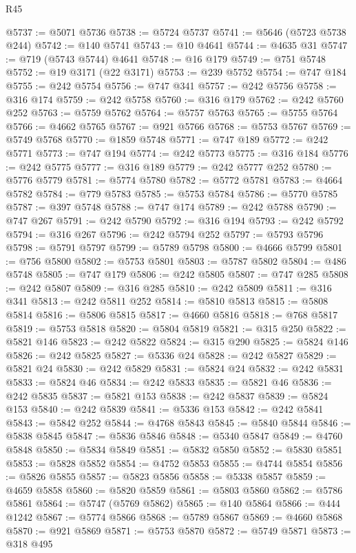 \begin{lexlean}{R45}
\begin{coremodule}
{@5737 := @5071 @5736
@5738 := @5724 @5737
@5741 := @5646 (@5723 @5738 @244)
@5742 := @140 @5741
@5743 := @10 @4641
@5744 := @4635 @31
@5747 := @719 (@5743 @5744) @4641
@5748 := @16 @179
@5749 := @751 @5748
@5752 := @19 @3171 (@22 @3171)
@5753 := @239 @5752
@5754 := @747 @184
@5755 := @242 @5754
@5756 := @747 @341
@5757 := @242 @5756
@5758 := @316 @174
@5759 := @242 @5758
@5760 := @316 @179
@5762 := @242 @5760 @252
@5763 := @5759 @5762
@5764 := @5757 @5763
@5765 := @5755 @5764
@5766 := @4662 @5765
@5767 := @921 @5766
@5768 := @5753 @5767
@5769 := @5749 @5768
@5770 := @1859 @5748
@5771 := @747 @189
@5772 := @242 @5771
@5773 := @747 @194
@5774 := @242 @5773
@5775 := @316 @184
@5776 := @242 @5775
@5777 := @316 @189
@5779 := @242 @5777 @252
@5780 := @5776 @5779
@5781 := @5774 @5780
@5782 := @5772 @5781
@5783 := @4664 @5782
@5784 := @779 @5783
@5785 := @5753 @5784
@5786 := @5770 @5785
@5787 := @397 @5748
@5788 := @747 @174
@5789 := @242 @5788
@5790 := @747 @267
@5791 := @242 @5790
@5792 := @316 @194
@5793 := @242 @5792
@5794 := @316 @267
@5796 := @242 @5794 @252
@5797 := @5793 @5796
@5798 := @5791 @5797
@5799 := @5789 @5798
@5800 := @4666 @5799
@5801 := @756 @5800
@5802 := @5753 @5801
@5803 := @5787 @5802
@5804 := @486 @5748
@5805 := @747 @179
@5806 := @242 @5805
@5807 := @747 @285
@5808 := @242 @5807
@5809 := @316 @285
@5810 := @242 @5809
@5811 := @316 @341
@5813 := @242 @5811 @252
@5814 := @5810 @5813
@5815 := @5808 @5814
@5816 := @5806 @5815
@5817 := @4660 @5816
@5818 := @768 @5817
@5819 := @5753 @5818
@5820 := @5804 @5819
@5821 := @315 @250
@5822 := @5821 @146
@5823 := @242 @5822
@5824 := @315 @290
@5825 := @5824 @146
@5826 := @242 @5825
@5827 := @5336 @24
@5828 := @242 @5827
@5829 := @5821 @24
@5830 := @242 @5829
@5831 := @5824 @24
@5832 := @242 @5831
@5833 := @5824 @46
@5834 := @242 @5833
@5835 := @5821 @46
@5836 := @242 @5835
@5837 := @5821 @153
@5838 := @242 @5837
@5839 := @5824 @153
@5840 := @242 @5839
@5841 := @5336 @153
@5842 := @242 @5841
@5843 := @5842 @252
@5844 := @4768 @5843
@5845 := @5840 @5844
@5846 := @5838 @5845
@5847 := @5836 @5846
@5848 := @5340 @5847
@5849 := @4760 @5848
@5850 := @5834 @5849
@5851 := @5832 @5850
@5852 := @5830 @5851
@5853 := @5828 @5852
@5854 := @4752 @5853
@5855 := @4744 @5854
@5856 := @5826 @5855
@5857 := @5823 @5856
@5858 := @5338 @5857
@5859 := @4659 @5858
@5860 := @5820 @5859
@5861 := @5803 @5860
@5862 := @5786 @5861
@5864 := @5747 (@5769 @5862)
@5865 := @140 @5864
@5866 := @444 @1242
@5867 := @5774 @5866
@5868 := @5789 @5867
@5869 := @4660 @5868
@5870 := @921 @5869
@5871 := @5753 @5870
@5872 := @5749 @5871
@5873 := @318 @495
}
\end{coremodule}
\end{lexlean}
